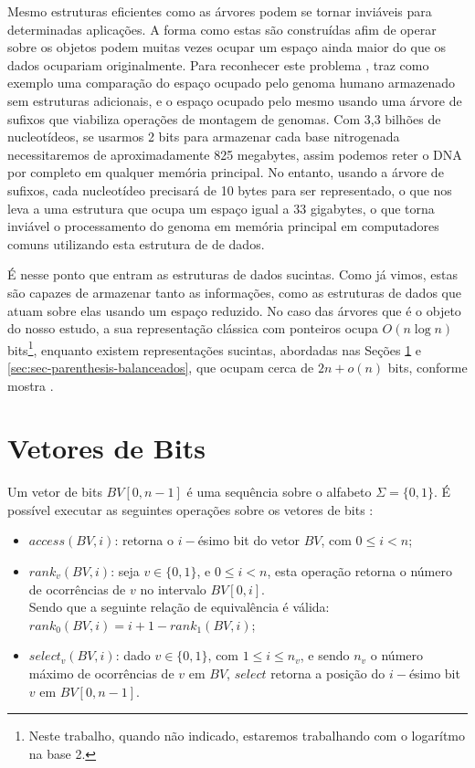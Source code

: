 Mesmo estruturas eficientes como as árvores podem se tornar inviáveis para determinadas aplicações. A forma como estas são construídas afim de operar sobre os objetos podem muitas vezes ocupar um espaço ainda maior do que os dados ocupariam originalmente. Para reconhecer este problema \citet{book-compact-data-structures}, traz como exemplo uma comparação do espaço ocupado pelo genoma humano armazenado sem estruturas adicionais, e o espaço ocupado pelo mesmo usando uma árvore de sufixos que viabiliza operações de montagem de genomas. Com  3,3 bilhões de nucleotídeos, se usarmos 2 bits para armazenar cada base nitrogenada necessitaremos de aproximadamente 825 megabytes, assim podemos reter o DNA por completo em qualquer memória principal. No entanto, usando a árvore de sufixos, cada nucleotídeo precisará de 10 bytes para ser representado, o que nos leva a uma estrutura que ocupa um espaço igual a 33 gigabytes, o que torna inviável o processamento do genoma em memória principal em computadores comuns utilizando esta estrutura de de dados. %

É nesse ponto que entram as estruturas de dados sucintas. Como já vimos, estas são capazes de armazenar tanto as informações, como as estruturas de dados que atuam sobre elas usando um espaço reduzido. No caso das árvores que é o objeto do nosso estudo, a sua representação clássica com ponteiros  ocupa  $O(n \log n)$ bits\footnote{Neste trabalho, quando não indicado, estaremos trabalhando com o logarítmo na base 2.}, enquanto existem representações sucintas, abordadas nas Seções \ref{sec:sec-bitvector} e \ref{sec:sec-parenthesis-balanceados}, que ocupam cerca de $2n+o(n)$ bits, conforme mostra \cite{book-compact-data-structures}.

\section{Vetores de Bits}\label{sec:sec-bitvector}
Um vetor de bits $BV[0,n-1]$  é uma sequência sobre o alfabeto $\Sigma = \{0,1\}$. É possível executar as seguintes operações sobre os vetores de bits \citep{book-compact-data-structures}:

\begin{itemize}
    \item $access(BV,i)$: retorna o $i-$ésimo bit do vetor $BV$, com $0 \leq i < n$;
    \item $rank_v(BV,i)$: seja $v \in \{0,1\}$, e $0 \leq i < n$, esta operação retorna o número de ocorrências de $v$ no intervalo $BV[0,i]$.\\
    Sendo que a seguinte relação de equivalência é válida: $rank_0(BV,i)=i +1  - rank_1(BV,i)$;
    \item $select_v(BV,i)$: dado $v \in \{0,1\}$, com $1 \leq i \leq n_v$, e sendo $n_v$ o número máximo de ocorrências de $v$ em $BV$,
    $select$ retorna a posição do $i-$ésimo bit $v$ em $BV[0,n-1]$.
\end{itemize}


